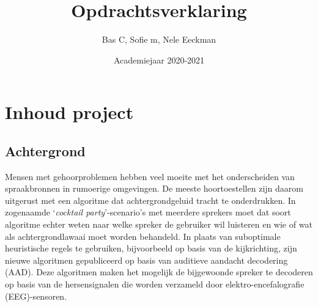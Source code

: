\documentclass[a4paper,kul]{kulakarticle}
\date{Academiejaar 2020-2021}
\title{Opdrachtsverklaring}
\author{Bas C, Sofie m, Nele Eeckman}
\begin{document}
	\maketitle
	
%	
%	
%	
	
		\section*{Inhoud project}
	
	\subsection*{Achtergrond}
	Mensen met gehoorproblemen hebben veel moeite met het onderscheiden van spraakbronnen in rumoerige omgevingen. De meeste hoortoestellen zijn daarom uitgerust met een algoritme dat achtergrondgeluid tracht te onderdrukken. In zogenaamde `\textit{cocktail party}'-scenario's met meerdere sprekers moet dat soort algoritme echter weten naar welke spreker de gebruiker wil luisteren en wie of wat als achtergrondlawaai moet worden behandeld. In plaats van suboptimale heuristische regels te gebruiken, bijvoorbeeld op basis van de kijkrichting, zijn nieuwe algoritmen gepubliceerd op basis van auditieve aandacht decodering (AAD). Deze algoritmen maken het mogelijk de bijgewoonde spreker te decoderen op basis van de hersensignalen die worden verzameld door elektro-encefalografie (EEG)-sensoren.
	
\end{document}
